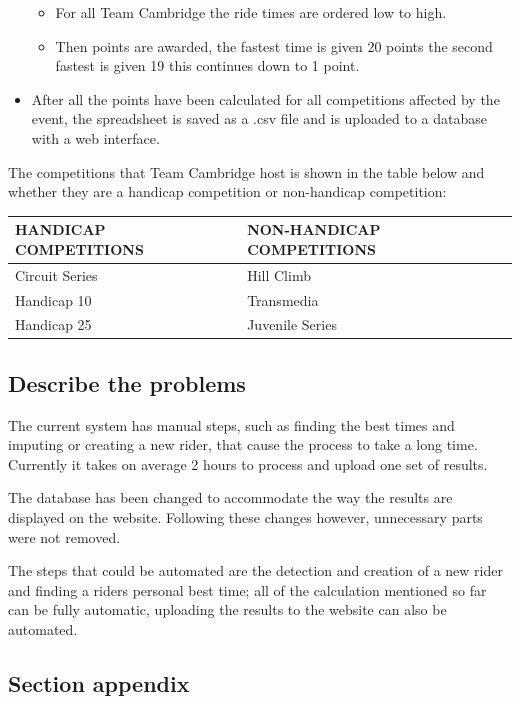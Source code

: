 \begin{itemize}
	\begin{itemize}
	\item For all Team Cambridge the ride times are ordered low to high.
	
	\item Then points are awarded, the fastest time is given 20 points the second fastest is given 19 this continues down to 1 point.
	\end{itemize}
	
	\item After all the points have been calculated for all competitions affected by the event, the spreadsheet is saved as a .csv file and is uploaded to a database with a web interface.
\end{itemize}

The competitions that Team Cambridge host is shown in the table below and whether they are a handicap competition or non-handicap competition:

\begin{tabular}{|l | l|}
	\hline
	HANDICAP COMPETITIONS & NON-HANDICAP COMPETITIONS \\ \hline
	Circuit Series        & Hill Climb \\ \hline 
	Handicap 10           & Transmedia \\ \hline
	Handicap 25           & Juvenile Series \\ \hline
\end{tabular}

\subsection{Describe the problems}
The current system has manual steps, such as finding the best times and imputing or creating a new rider, that cause the process to take a long time. Currently it takes on average 2 hours to process and upload one set of results.

The database has been changed to accommodate the way the results are displayed on the website. Following these changes  however, unnecessary parts were not removed.

The steps that could be automated are the detection and creation of a new rider and finding a riders personal best time; all of the calculation mentioned so far can be fully automatic, uploading the results to the website can also be automated.


\subsection{Section appendix}

